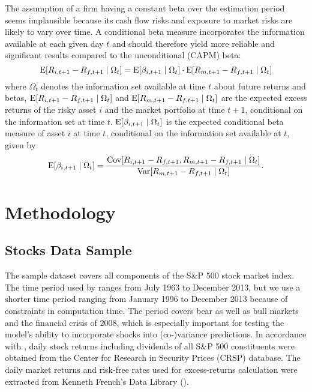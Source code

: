 \documentclass[11pt,a4paper]{article}
\def \indexName {S\&P 500}
\def \periodFrom {January 1996}
\def \periodTo {December 2013}
\begin{document}
The assumption of a firm having a constant beta over the estimation period seems implausible because its cash flow risks and exposure to market risks are likely to vary over time. A conditional beta measure incorporates the information available at each given day $t$ and should therefore yield more reliable and significant results compared to the unconditional (CAPM) beta:
\begin{equation}
\textrm{E}[R_{i,t+1} - R_{f,t+1} \mid \Omega_t] = \textrm{E}[\beta_{i,t+1} \mid \Omega_t] \cdot \textrm{E}[R_{m,t+1} - R_{f,t+1} \mid \Omega_t]
\end{equation}
where $\Omega_t$ denotes the information set available at time $t$ about future returns and betas, $\textrm{E}[R_{i,t+1} - R_{f,t+1} \mid \Omega_t]$ and $\textrm{E}[R_{m,t+1} - R_{f,t+1}  \mid \Omega_t]$ are the expected excess returns of the risky asset $i$ and the market portfolio at time $t+1$, conditional on the information set at time $t$. $\textrm{E}[\beta_{i,t+1} \mid \Omega_t]$ is the expected conditional beta measure of asset $i$ at time $t$, conditional on the information set available at $t$, given by
\begin{equation}
    \textrm{E}[\beta_{i,t+1} \mid \Omega_t] = \dfrac{ \textrm{Cov}[ R_{i,t+1} - R_{f,t+1}, R_{m,t+1} - R_{f,t+1} \mid \Omega_t ] }{ \textrm{Var}[ R_{m,t+1} - R_{f,t+1} \mid \Omega_t ]  }.
\end{equation}








\newpage
\section{Methodology}

\subsection{Stocks Data Sample}

The sample dataset covers all components of the \indexName{} stock market index. The time period used by  ranges from July 1963 to December 2013, but we use a shorter time period ranging from \periodFrom{} to \periodTo{} because of constraints in computation time. The period covers bear as well as bull markets and the financial crisis of 2008, which is especially important for testing the model's ability to incorporate shocks into (co-)variance predictions. In accordance with , daily stock returns including dividends of all \indexName{} constituents were obtained from the Center for Research in Security Prices (CRSP) database. The daily market returns and risk-free rates used for excess-returns calculation were extracted from Kenneth French's Data Library ().
\end{document}
